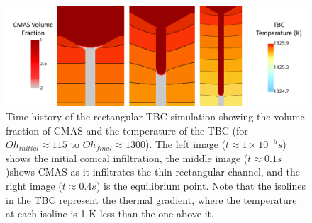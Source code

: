 \documentclass{UCF_ETD}
\begin{document}
\begin{figure}
    \centering
    \includegraphics[width=\linewidth]{Figures/rect_timeHistory.png}
    \caption{Time history of the rectangular TBC simulation showing the volume fraction of CMAS and the temperature of the TBC (for $Oh_{initial} \approx 115$ to $Oh_{final} \approx 1300$). The left image ($t \approx 1\times 10^{-5}s$) shows the initial conical infiltration, the middle image ($t \approx 0.1 s$)shows CMAS as it infiltrates the thin rectangular channel, and the right image ($t \approx 0.4 s$) is the equilibrium point. Note that the isolines in the TBC represent the thermal gradient, where the temperature at each isoline is 1 K less than the one above it.}
    \label{fig:rect_timehistory}
\end{figure}



\end{document}
